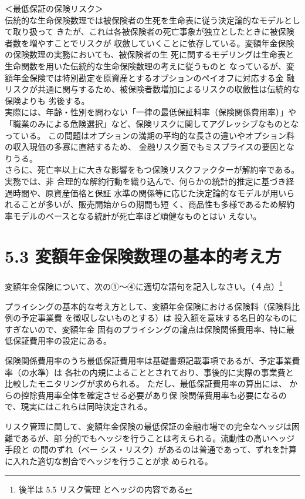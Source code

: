 \documentclass[report,gutter=10mm,fore-edge=10mm,uplatex,dvipdfmx]{jlreq}
\begin{document}
＜最低保証の保険リスク＞\\
伝統的な生命保険数理では被保険者の生死を生命表に従う決定論的なモデルとして取り扱って
きたが、これは各被保険者の死亡事象が独立としたときに被保険者数を増やすことでリスクが
収斂していくことに依存している。変額年金保険の保険数理の実務においても、被保険者の生
死に関するモデリングは生命表と生命関数を用いた伝統的な生命保険数理の考えに従うものと
なっているが、変額年金保険では特別勘定を原資産とするオプションのペイオフに対応する金
融リスクが共通に関与するため、被保険者数増加によるリスクの収斂性は伝統的な保険よりも
劣後する。\\
実際には、年齢・性別を問わない「一律の最低保証料率（保険関係費用率）」や
「職業のみによる危険選択」など、保険リスクに関してアグレッシブなものとなっている。
この問題はオプションの満期の平均的な長さの違いやオプション料の収入現価の多寡に直結するため、
金融リスク面でもミスプライスの要因となりうる。\\
さらに、死亡率以上に大きな影響をもつ保険リスクファクターが解約率である。実務では、非
合理的な解約行動を織り込んで、何らかの統計的推定に基づき経過時間や、原資産価格と保証
水準の関係等に応じた決定論的なモデルが用いられることが多いが、販売開始からの期間も短
く、商品性も多様であるため解約率モデルのベースとなる統計が死亡率ほど頑健なものとはい
えない。
\section{5.3 変額年金保険数理の基本的考え方}
変額年金保険について、次の①～④に適切な語句を記入しなさい。（４点）\footnote{後半は 5.5 リスク管理 とヘッジの内容である}

プライシングの基本的な考え方として、変額年金保険における保険料（保険料比例の予定事業費
を徴収しないものとする）は
投入額を意味する名目的なものにすぎないので、変額年金
固有のプライシングの論点は保険関係費用率、特に最低保証費用率の設定にある。

保険関係費用率のうち最低保証費用率は基礎書類記載事項であるが、予定事業費率（の水準）は
各社の内規によることとされており、事後的に実際の事業費と比較したモニタリングが求められる。
ただし、最低保証費用率の算出には、
からの控除費用率全体を確定させる必要があり保
険関係費用率も必要になるので、現実にはこれらは同時決定される。
\vspace{1zh}

リスク管理に関して、変額年金保険の最低保証の金融市場での完全なヘッジは困難であるが、部
分的でもヘッジを行うことは考えられる。流動性の高いヘッジ手段と
の間のずれ（ベー
シス・リスク）があるのは普通であって、ずれを計算に入れた適切な割合でヘッジを行うことが求
められる。
\end{document}
